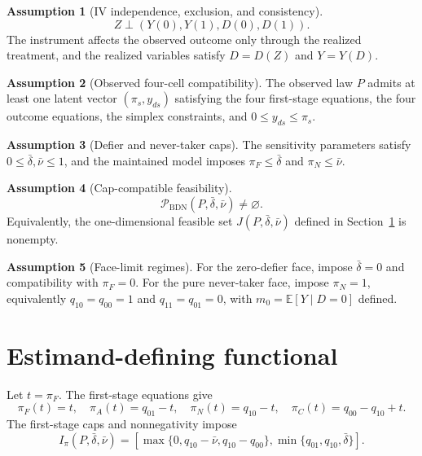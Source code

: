 \documentclass[11pt]{article}
\newcommand{\E}{\mathbb{E}}
\theoremstyle{definition}
\newtheorem{assumption}{Assumption}
\theoremstyle{plain}
\theoremstyle{remark}
\begin{document}
\begin{assumption}[IV independence, exclusion, and consistency]\label{ass:iv}
\[
Z\perp (Y(0),Y(1),D(0),D(1)).
\]
The instrument affects the observed outcome only through the realized
treatment, and the realized variables satisfy \(D=D(Z)\) and \(Y=Y(D)\).
\end{assumption}

\begin{assumption}[Observed four-cell compatibility]\label{ass:compatibility}
The observed law \(P\) admits at least one latent vector
\((\pi_s,y_{ds})\) satisfying the four first-stage equations, the four outcome
equations, the simplex constraints, and \(0\le y_{ds}\le\pi_s\).
\end{assumption}

\begin{assumption}[Defier and never-taker caps]\label{ass:caps}
The sensitivity parameters satisfy \(0\le\bar\delta,\bar\nu\le1\), and the
maintained model imposes \(\pi_F\le\bar\delta\) and
\(\pi_N\le\bar\nu\).
\end{assumption}

\begin{assumption}[Cap-compatible feasibility]\label{ass:capped-feasible}
\[
\mathcal{P}_{\mathrm{BDN}}(P,\bar\delta,\bar\nu)\ne\varnothing .
\]
Equivalently, the one-dimensional feasible set \(J(P,\bar\delta,\bar\nu)\)
defined in Section~\ref{sec:functional} is nonempty.
\end{assumption}

\begin{assumption}[Face-limit regimes]\label{ass:faces}
For the zero-defier face, impose \(\bar\delta=0\) and compatibility with
\(\pi_F=0\).  For the pure never-taker face, impose \(\pi_N=1\), equivalently
\(q_{10}=q_{00}=1\) and \(q_{11}=q_{01}=0\), with
\(m_0=\E[Y\mid D=0]\) defined.
\end{assumption}

\section{Estimand-defining functional}\label{sec:functional}
Let \(t=\pi_F\).  The first-stage equations give
\[
\pi_F(t)=t,\quad
\pi_A(t)=q_{01}-t,\quad
\pi_N(t)=q_{10}-t,\quad
\pi_C(t)=q_{00}-q_{10}+t.
\]
The first-stage caps and nonnegativity impose
\[
I_\pi(P,\bar\delta,\bar\nu)=
\left[
\max\{0,q_{10}-\bar\nu,q_{10}-q_{00}\},
\min\{q_{01},q_{10},\bar\delta\}
\right].
\]
\end{document}
